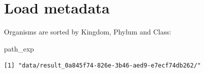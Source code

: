 \documentclass[
  letterpaper,
  DIV=11,
  numbers=noendperiod]{scrreprt}
\newenvironment{Shaded}{}{}
\newcommand{\NormalTok}[1]{\textcolor[rgb]{0.67,0.70,0.75}{#1}}
\begin{document}
\hypertarget{load-metadata}{%
\section{Load metadata}\label{load-metadata}}

Organisms are sorted by Kingdom, Phylum and Class:

\begin{Shaded}
\begin{Highlighting}[]
\NormalTok{path\_exp}
\end{Highlighting}
\end{Shaded}

\begin{verbatim}
[1] "data/result_0a845f74-826e-3b46-aed9-e7ecf74db262/"
\end{verbatim}
\end{document}
